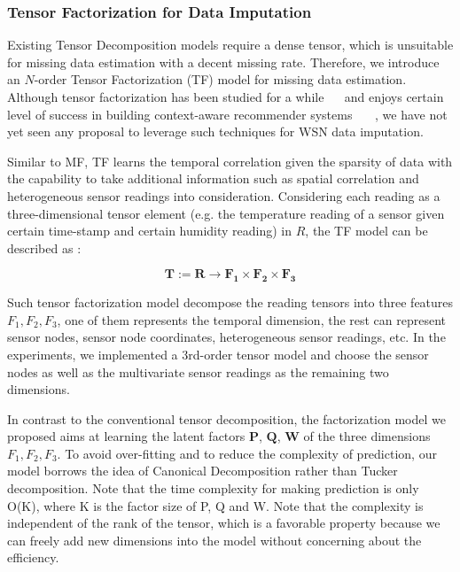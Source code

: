 \subsubsection{Tensor Factorization for Data Imputation} \label{sec:tfmissing}

Existing Tensor Decomposition models require a dense tensor, which is unsuitable for missing data estimation with a decent missing rate. 
Therefore, we introduce an $N$-order Tensor Factorization (TF) model for missing data estimation. Although tensor factorization has been studied for a while ~\cite{tg2009td}~\cite{bergqvist2010hosvd} and enjoys certain level of success in building context-aware recommender systems ~\cite{karatzoglou2010multiverse}~\cite{steffen2010pairwise}~\cite{zeno2010context}, we have not yet seen any proposal to leverage such techniques for WSN data imputation.

Similar to MF, TF learns the temporal correlation given the sparsity of data with the capability to take additional information such as spatial correlation and heterogeneous sensor readings into consideration.
Considering each reading as a three-dimensional tensor element (e.g. the temperature reading of a sensor given certain time-stamp and certain humidity reading) in $R$, the TF model can be described as :

\begin{equation*}
\mathbf{T} := \mathbf{R} \rightarrow \mathbf{F_1} \times  \mathbf{F_2} \times \mathbf{F_3} 
\end{equation*}

Such tensor factorization model decompose the reading tensors into three features $F_1, F_2 , F_3$, one of them represents the temporal dimension, the rest can represent sensor nodes, sensor node coordinates, heterogeneous sensor readings, etc. In the experiments, we implemented a 3rd-order tensor model and choose the sensor nodes as well as the multivariate sensor readings as the remaining two dimensions.

In contrast to the conventional tensor decomposition, the factorization model we proposed aims at learning the latent factors $\mathbf{P}$,  $\mathbf{Q}$, $\mathbf{W}$ of the three dimensions $F_1, F_2, F_3$.
To avoid over-fitting and to reduce the complexity of prediction, our model borrows the idea of Canonical Decomposition rather than Tucker decomposition. Note that the time complexity for making prediction is only O(K), where K is the factor size of  P, Q and W. Note that the complexity is independent of the rank of the tensor, which is a favorable property because we can freely add new dimensions into the model without concerning about the efficiency.

